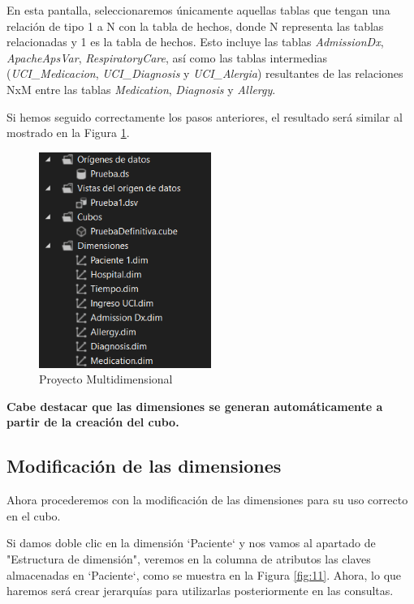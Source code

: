 \documentclass[12pt, a4paper, twoside]{article}
\begin{document}
	En esta pantalla, seleccionaremos únicamente aquellas tablas que tengan una relación de tipo 1 a N con la tabla de hechos, donde N representa las tablas relacionadas y 1 es la tabla de hechos. Esto incluye las tablas \textit{AdmissionDx}, \textit{ApacheApsVar}, \textit{RespiratoryCare}, así como las tablas intermedias (\textit{UCI\_Medicacion}, \textit{UCI\_Diagnosis} y \textit{UCI\_Alergia}) resultantes de las relaciones NxM entre las tablas \textit{Medication}, \textit{Diagnosis} y \textit{Allergy}.

	Si hemos seguido correctamente los pasos anteriores, el resultado será similar al mostrado en la Figura \ref{fig:8}.

	\begin{figure}[H]
		\centering
		\includegraphics[width=0.5\textwidth]{image/loquellevamos}
		\caption{Proyecto Multidimensional}
		\label{fig:8}
	\end{figure}

	\textbf{Cabe destacar que las dimensiones se generan automáticamente a partir de la creación del cubo.}
	
\subsection{Modificación de las dimensiones}

	Ahora procederemos con la modificación de las dimensiones para su uso correcto en el cubo.

	Si damos doble clic en la dimensión `Paciente` y nos vamos al apartado de "Estructura de dimensión", veremos en la columna de atributos las claves almacenadas en `Paciente`, como se muestra en la Figura \ref{fig:11}. Ahora, lo que haremos será crear jerarquías para utilizarlas posteriormente en las consultas.
\end{document}
